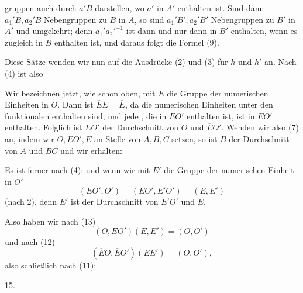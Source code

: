 gruppen auch durch $a'B$ darstellen, wo $a'$ in $A'$ enthalten ist. Sind dann $a_1'B, a_2'B$  Nebengruppen zu $B$ in $A$, so sind $a_1'B', a_2'B'$  Nebengruppen zu $B'$ in $A'$ und umgekehrt; denn $a_1'a_2'^{-1}$ ist dann und nur dann in $B'$ enthalten, wenn es zugleich in $B$ enthalten ist, und daraus folgt die Formel (9).

Diese S\"atze wenden wir nun auf die Ausdr\"ucke (2) und (3) f\"ur $h$ und $h'$ an. Nach (4) ist
also

Wir bezeichnen jetzt, wie schon oben, mit $E$ die Gruppe der numerischen Einheiten in $O$. Dann ist $\overline{E}E = \overline{E}$, da die numerischen Einheiten unter den funktionalen enthalten sind, und jede , die in $\overline{E}O'$ enthalten ist, ist in $EO'$ enthalten. Folglich ist $EO'$ der Durchschnitt von $O$ und $\overline{E}O'$. Wenden wir also (7) an, indem wir $O, EO', \overline{E}$ an Stelle von $A, B, C$ setzen, so ist $B$ der Durchschnitt von $A$ und $BC$ und wir erhalten:

Es ist ferner nach (4):
und wenn wir mit $E'$ die Gruppe der numerischen Einheit in $O'$ %
\[
(EO', O') = (EO', E'O') = (E, E')
\]
(nach 2), denn $E'$ ist der Durchschnitt von $E'O'$ und $E$.

Also haben wir nach (13)
\[
(O, EO')(E, E') = (O, O')
\]
und nach (12)
\[
(\overline{E}O, \overline{E}O')(EE') = (O, O'), %
\]
also schlie\ss lich nach (11):

15. 
